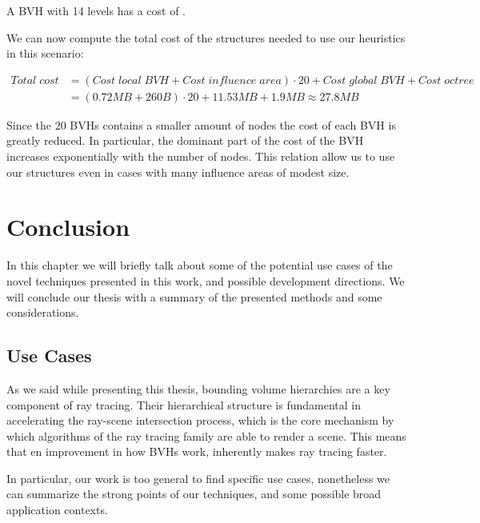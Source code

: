 \documentclass{PoliMi_MasterThesis}
\begin{document}
A BVH with 14 levels has a cost of \unboldmath.

We can now compute the total cost of the structures needed to use our heuristics in this scenario:

\begin{subequations}
	\begin{align*}
		Total\;cost &= (Cost\;local\;BVH + Cost\;influence\;area) \cdot 20 + Cost\;global\;BVH + Cost\;octree\\
		&= (0.72MB + 260B) \cdot 20 + 11.53MB + 1.9MB \approx 27.8MB
	\end{align*}
\end{subequations}

Since the $20$ BVHs contains a smaller amount of nodes the cost of each BVH is greatly reduced. In particular, the dominant part of the cost of the BVH increases exponentially with the number of nodes. This relation allow us to use our structures even in cases with many influence areas of modest size.

\chapter{Conclusion} \label{ch:conclusion}
In this chapter we will briefly talk about some of the potential use cases of the novel techniques presented in this work, and possible development directions. We will conclude our thesis with a summary of the presented methods and some considerations.

\section{Use Cases} \label{sec:use_cases}
As we said while presenting this thesis, bounding volume hierarchies are a key component of ray tracing. Their hierarchical structure is fundamental in accelerating the ray-scene intersection process, which is the core mechanism by which algorithms of the ray tracing family are able to render a scene. This means that en improvement in how BVHs work, inherently makes ray tracing faster.

In particular, our work is too general to find specific use cases, nonetheless we can summarize the strong points of our techniques, and some possible broad application contexts.
\end{document}
